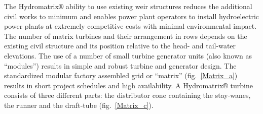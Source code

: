 The Hydromatrix$\circledR$ ability to use existing weir structures reduces the  additional civil works to minimum and enables power plant operators to install hydroelectric power plants at extremely competitive costs with minimal environmental impact. The number of matrix turbines and their arrangement in rows depends on the existing civil structure and its position relative to the head- and tail-water elevations. The use of a number of small turbine generator units (also known as “modules”) results in simple and robust turbine and generator design. The standardized modular factory assembled grid or “matrix” (fig.\ \ref{Matrix_a}) results in short project schedules and high availability. A Hydromatrix$\circledR$ turbine consists of three different parts: the distributor cone containing the stay-wanes, the runner and the draft-tube (fig.\ \ref{Matrix_c}).



